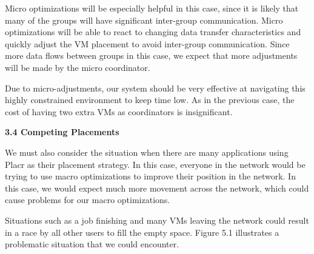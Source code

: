 \documentclass[11pt]{article}
\begin{document}
Micro optimizations will be especially helpful in this case, since it is likely that many of the groups will have significant inter-group communication.  Micro optimizations will be able to react to changing data transfer characteristics and quickly adjust the VM placement to avoid inter-group communication.  Since more data flows between groups in this case, we expect that more adjustments will be made by the micro coordinator.

Due to micro-adjustments, our system should be very effective at navigating this highly constrained environment to keep time low.  As in the previous case, the cost of having two extra VMs as coordinators is insignificant.


\Large{\textbf{3.4 Competing Placements}}
\normalsize


We must also consider the situation when there are many applications using Placr as their placement strategy.  In this case, everyone in the network would be trying to use macro optimizations to improve their position in the network.  In this case, we would expect much more movement across the network, which could cause problems for our macro optimizations.

Situations such as a job finishing and many VMs leaving the network could result in a race by all other users to fill the empty space.  Figure 5.1 illustrates a problematic situation that we could encounter.
\end{document}
